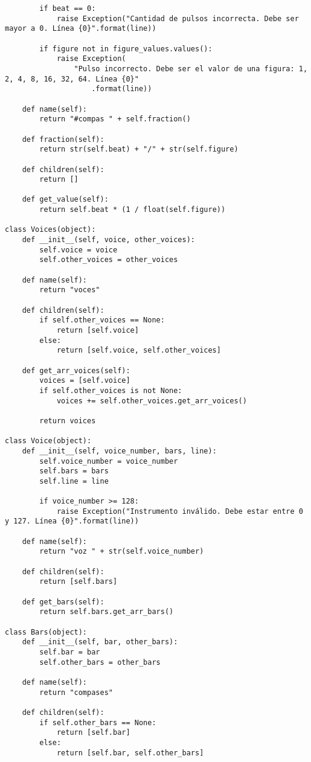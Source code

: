 \begin{verbatim}
        if beat == 0:
            raise Exception("Cantidad de pulsos incorrecta. Debe ser mayor a 0. Línea {0}".format(line))

        if figure not in figure_values.values():
            raise Exception(
                "Pulso incorrecto. Debe ser el valor de una figura: 1, 2, 4, 8, 16, 32, 64. Línea {0}"
                    .format(line))

    def name(self):
        return "#compas " + self.fraction()

    def fraction(self):
        return str(self.beat) + "/" + str(self.figure)

    def children(self):
        return []

    def get_value(self):
        return self.beat * (1 / float(self.figure))

class Voices(object):
    def __init__(self, voice, other_voices):
        self.voice = voice
        self.other_voices = other_voices

    def name(self):
        return "voces"

    def children(self):
        if self.other_voices == None:
            return [self.voice]
        else:
            return [self.voice, self.other_voices]

    def get_arr_voices(self):
        voices = [self.voice]
        if self.other_voices is not None:
            voices += self.other_voices.get_arr_voices()

        return voices

class Voice(object):
    def __init__(self, voice_number, bars, line):
        self.voice_number = voice_number
        self.bars = bars
        self.line = line

        if voice_number >= 128:
            raise Exception("Instrumento inválido. Debe estar entre 0 y 127. Línea {0}".format(line))

    def name(self):
        return "voz " + str(self.voice_number)

    def children(self):
        return [self.bars]

    def get_bars(self):
        return self.bars.get_arr_bars()

class Bars(object):
    def __init__(self, bar, other_bars):
        self.bar = bar
        self.other_bars = other_bars

    def name(self):
        return "compases"

    def children(self):
        if self.other_bars == None:
            return [self.bar]
        else:
            return [self.bar, self.other_bars]


\end{verbatim}
